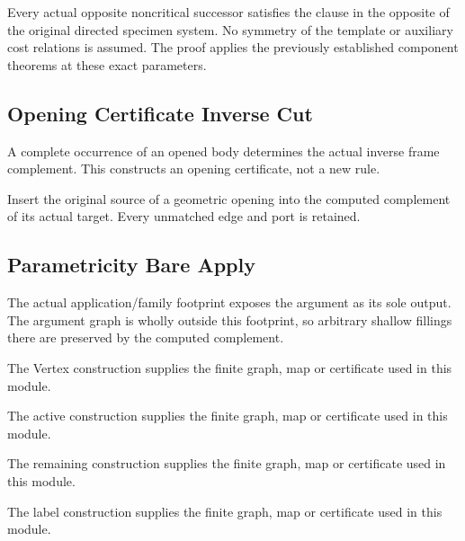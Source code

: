 Every actual opposite noncritical successor satisfies the clause in the
opposite of the original directed specimen system. No symmetry of the
template or auxiliary cost relations is assumed.
The proof applies the previously established component theorems at these exact parameters.
\par{}

\subsection{Opening Certificate Inverse Cut}
A complete occurrence of an opened body determines the actual inverse
frame complement. This constructs an opening certificate, not a new rule.

Insert the original source of a geometric opening into the computed
complement of its actual target. Every unmatched edge and port is retained.
\par{}

\subsection{Parametricity Bare Apply}
The actual application/family footprint exposes the argument as its sole
output. The argument graph is wholly outside this footprint, so arbitrary
shallow fillings there are preserved by the computed complement.

The Vertex construction supplies the finite graph, map or certificate used in this module.
\par{}

The active construction supplies the finite graph, map or certificate used in this module.
\par{}

The remaining construction supplies the finite graph, map or certificate used in this module.
\par{}

The label construction supplies the finite graph, map or certificate used in this module.
\par{}

